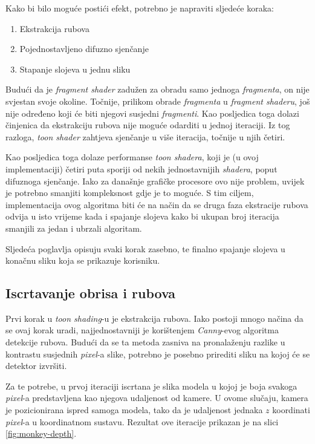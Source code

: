 Kako bi bilo moguće postići efekt, potrebno je napraviti sljedeće koraka:

\begin{enumerate}
\item Ekstrakcija rubova
\item Pojednostavljeno difuzno sjenčanje
\item Stapanje slojeva u jednu sliku
\end{enumerate}

Budući da je \emph{fragment shader} zadužen za obradu samo jednoga \emph{fragmenta}, on nije svjestan svoje okoline. Točnije, prilikom obrade \emph{fragmenta} u \emph{fragment shaderu}, još nije određeno koji će biti njegovi susjedni \emph{fragmenti}. Kao posljedica toga dolazi činjenica da ekstrakciju rubova nije moguće odarditi u jednoj iteraciji. Iz tog razloga, \emph{toon shader} zahtjeva sjenčanje u više iteracija, točnije u njih četiri.

Kao posljedica toga dolaze performanse \emph{toon shadera}, koji je (u ovoj implementaciji) četiri puta sporiji od nekih jednostavnijih \emph{shadera}, poput difuznoga sjenčanje. Iako za današnje grafičke procesore ovo nije problem, uvijek je potrebno smanjiti kompleksnost gdje je to moguće. S tim ciljem, implementacija ovog algoritma biti će na način da se druga faza ekstracije rubova odvija u isto vrijeme kada i spajanje slojeva kako bi ukupan broj iteracija smanjili za jedan i ubrzali algoritam.

Sljedeća poglavlja opisuju svaki korak zasebno, te finalno spajanje slojeva u konačnu sliku koja se prikazuje korisniku.

\subsection{Iscrtavanje obrisa i rubova}
\label{sec:edge-detection}

Prvi korak u \emph{toon shading}-u je ekstrakcija rubova. Iako postoji mnogo načina da se ovaj korak uradi, najjednostavniji je korištenjem \emph{Canny}-evog algoritma detekcije rubova. Budući da se ta metoda zasniva na pronalaženju razlike u kontrastu susjednih \emph{pixel}-a slike, potrebno je posebno prirediti sliku na kojoj će se detektor izvršiti.

Za te potrebe, u prvoj iteraciji iscrtana je slika modela u kojoj je boja svakoga \emph{pixel}-a predstavljena kao njegova udaljenost od kamere. U ovome slučaju, kamera je pozicionirana ispred samoga modela, tako da je udaljenost jednaka $z$ koordinati \emph{pixel}-a u koordinatnom sustavu. Rezultat ove iteracije prikazan je na slici \ref{fig:monkey-depth}.


